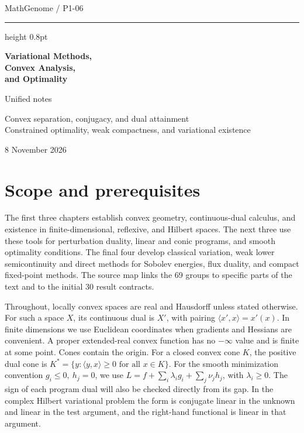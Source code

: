 \documentclass[11pt,oneside,openany]{book}
\theoremstyle{plain}
\theoremstyle{definition}
\theoremstyle{remark}
\begin{document}
\frontmatter
\hypersetup{pageanchor=false}
\begin{titlepage}
\thispagestyle{empty}
\vspace*{31mm}
{\large MathGenome \enspace / \enspace P1-06\par}
\vspace{7mm}
\hrule height 0.8pt
\vspace{11mm}
{\Huge\bfseries Variational Methods,\\[2mm] Convex Analysis,\\[2mm] and Optimality\par}
\vspace{13mm}
{\large Unified notes\par}
\vspace{4mm}
{\normalsize Convex separation, conjugacy, and dual attainment\\
Constrained optimality, weak compactness, and variational existence\par}
\vfill
{\large 8 November 2026\par}
\end{titlepage}
\hypersetup{pageanchor=true}
\tableofcontents

\chapter*{Scope and prerequisites}

The first three chapters establish convex geometry, continuous-dual
calculus, and existence in finite-dimensional, reflexive, and Hilbert
spaces. The next three use these tools for perturbation duality, linear
and conic programs, and smooth optimality conditions. The final four
develop classical variation, weak lower semicontinuity and direct
methods for Sobolev energies, flux duality, and compact fixed-point
methods. The source map links the 69 groups to specific parts of the
text and to the initial 30 result contracts.

Throughout, locally convex spaces are real and Hausdorff unless stated
otherwise. For such a space \(X\), its continuous dual is \(X'\), with
pairing \(\langle x',x\rangle=x'(x)\). In finite dimensions we use
Euclidean coordinates when gradients and Hessians are convenient.
A proper extended-real convex function has no \(-\infty\) value and
is finite at some point. Cones contain the origin. For a closed convex cone \(K\), the positive
dual cone is \(K^*=\{y:\langle y,x\rangle\ge 0\text{ for all }x\in K\}\).
For the smooth minimization convention \(g_i\le0,\ h_j=0\), we use
\(L=f+\sum_i\lambda_i g_i+\sum_j\nu_j h_j\), with \(\lambda_i\ge0\).
The sign of each program dual will also be checked directly from its gap.
In the complex Hilbert variational problem the form is conjugate linear
in the unknown and linear in the test argument, and the right-hand
functional is linear in that argument.
\end{document}
